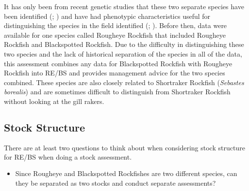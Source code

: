 \documentclass[
]{scrartcl}
\providecommand{\tightlist}{%
  \setlength{\itemsep}{0pt}\setlength{\parskip}{0pt}}\usepackage{longtable,booktabs,array}
\begin{document}
It has only been from recent genetic studies that these two separate
species have been identified
(;
) and have
had phenotypic characteristics useful for distinguishing the species in
the field identified (; ).
Before then, data were available for one species called Rougheye
Rockfish that included Rougheye Rockfish and Blackspotted Rockfish. Due
to the difficulty in distinguishing these two species and the lack of
historical separation of the species in all of the data, this assessment
combines any data for Blackspotted Rockfish with Rougheye Rockfish into
RE/BS and provides management advice for the two species combined. These
species are also closely related to Shortraker Rockfish (\emph{Sebastes
borealis}) and are sometimes difficult to distinguish from Shortraker
Rockfish without looking at the gill rakers.

\subsection{Stock Structure}\label{sec-stock_structure}

There are at least two questions to think about when considering stock
structure for RE/BS when doing a stock assessment.

\begin{itemize}
\tightlist
\item
  Since Rougheye and Blackspotted Rockfishes are two different species,
  can they be separated as two stocks and conduct separate assessments?
\end{itemize}
\end{document}
